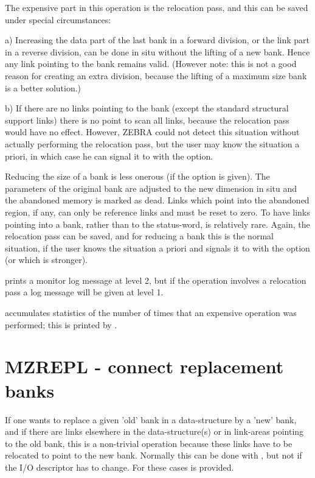 The expensive part in this operation is the relocation pass,
and this can be saved under special circumstances:

 a) Increasing the data part of the last bank in a forward division,
or the link part in a reverse division,
can be done in situ without the lifting of a new bank.
Hence any link pointing to the bank remains valid.
(However note: this is not a good reason for creating an extra
division, because the lifting of a maximum size bank is
a better solution.)

 b) If there are no links pointing to the bank (except the
standard structural support links)
there is no point to scan all links,
because the relocation pass would have no effect.
However, ZEBRA could not detect this situation without actually
performing the relocation pass,
but the user may know the situation a priori,
in which case he can signal it to  with the  option.

Reducing the size of a bank is less onerous (if
the  option is given).
The parameters of the original bank are adjusted to the
new dimension in situ and the abandoned memory is marked as dead.
Links which point into the abandoned region, if any,
can only be reference links and must be reset to zero.
To have links pointing into a bank, rather than to the status-word,
is relatively rare.
Again, the relocation pass can be saved,
and for reducing a bank this is the normal situation,
if the user knows the situation a priori and signals it to
 with the  option (or  which is stronger).

 prints a monitor log message at level 2,
but if the operation involves a relocation pass a log message
will be given at level 1.

 accumulates statistics of the number of times that an
expensive operation was performed;
this is printed by .

\section{MZREPL - connect replacement banks}

If one wants to replace a given 'old' bank in a data-structure
by a 'new' bank,
and if there are links elsewhere in the data-structure(s)
or in link-areas pointing to the old bank,
this is a non-trivial operation because these links
have to be relocated to point to the new bank.
Normally this can be done with ,
but not if the I/O descriptor has to change.
For these cases  is provided.

